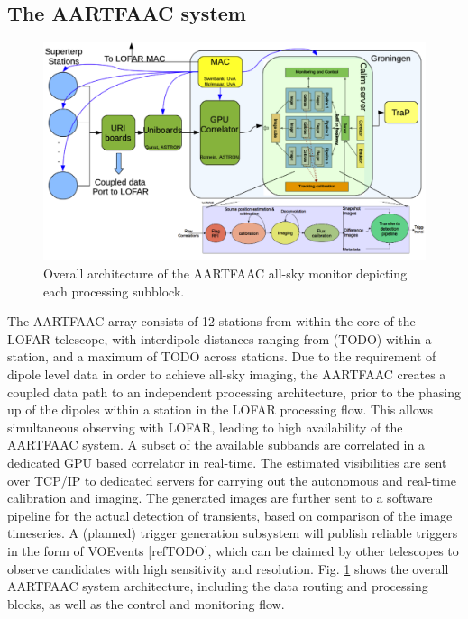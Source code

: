 \documentclass{ws-jai}
\begin{document}
\subsection {\label{subsec:aartfaac}  The AARTFAAC system}
\begin{figure}[htbp]
\centering
\includegraphics[width=1\textwidth]{Figs/overall_afaac_Arch_blks.png}
\caption {Overall  architecture of the  AARTFAAC all-sky monitor  depicting each
  processing subblock.}
\label{fig:afaac_arch}
\end{figure}

The AARTFAAC  array consists of  12-stations from within  the core of  the LOFAR
telescope, with interdipole distances ranging  from (TODO) within a station, and
a maximum of TODO across stations.  Due  to the requirement of dipole level data
in order to achieve all-sky imaging, the AARTFAAC creates a coupled data path to
an independent processing  architecture, prior to the phasing up  of the dipoles
within  a  station in  the  LOFAR  processing  flow.  This  allows  simultaneous
observing with  LOFAR, leading to  high availability  of the AARTFAAC  system. A
subset  of the  available  subbands  are correlated  in  a  dedicated GPU  based
correlator in  real-time.  The  estimated visibilities are  sent over  TCP/IP to
dedicated servers for carrying out  the autonomous and real-time calibration and
imaging.  The generated  images are further sent to a  software pipeline for the
actual detection of transients, based on  comparison of the image timeseries.  A
(planned) trigger  generation subsystem  will publish  reliable triggers  in the
form of VOEvents [refTODO], which can  be claimed by other telescopes to observe
candidates with high sensitivity and resolution. Fig. \ref{fig:afaac_arch} shows
the  overall  AARTFAAC  system  architecture, including  the  data  routing  and
processing blocks, as well as the control and monitoring flow.
\end{document}
